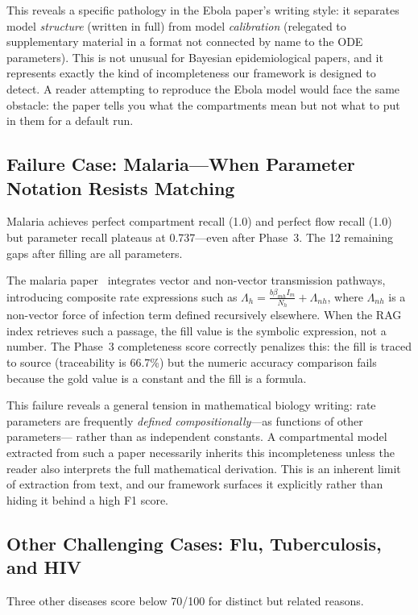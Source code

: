 This reveals a specific pathology in the Ebola paper's writing style: it separates
model \emph{structure} (written in full) from model \emph{calibration} (relegated to
supplementary material in a format not connected by name to the ODE parameters).
This is not unusual for Bayesian epidemiological papers, and it represents exactly
the kind of incompleteness our framework is designed to detect. A reader attempting
to reproduce the Ebola model would face the same obstacle: the paper tells you what
the compartments mean but not what to put in them for a default run.

\subsection{Failure Case: Malaria---When Parameter Notation Resists Matching}

Malaria achieves perfect compartment recall (1.0) and perfect flow recall (1.0) but
parameter recall plateaus at 0.737---even after Phase~3. The 12 remaining gaps after
filling are all parameters.

The malaria paper~\cite{Akowe2025Malaria} integrates vector and non-vector transmission
pathways, introducing composite rate expressions such as
$\Lambda_h = \frac{b \beta_{mh} I_m}{N_h} + \Lambda_{nh}$, where $\Lambda_{nh}$ is
a non-vector force of infection term defined recursively elsewhere. When the RAG index
retrieves such a passage, the fill value is the symbolic expression, not a number. The
Phase~3 completeness score correctly penalizes this: the fill is traced to source
(traceability is 66.7\%) but the numeric accuracy comparison fails because the gold
value is a constant and the fill is a formula.

This failure reveals a general tension in mathematical biology writing: rate parameters
are frequently \emph{defined compositionally}---as functions of other parameters---
rather than as independent constants. A compartmental model extracted from such a paper
necessarily inherits this incompleteness unless the reader also interprets the full
mathematical derivation. This is an inherent limit of extraction from text, and
our framework surfaces it explicitly rather than hiding it behind a high F1 score.

\subsection{Other Challenging Cases: Flu, Tuberculosis, and HIV}

Three other diseases score below 70/100 for distinct but related reasons.

